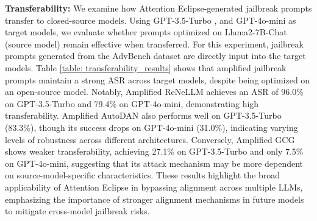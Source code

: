 \noindent \textbf{Transferability:} We examine how Attention Eclipse-generated jailbreak prompts transfer to closed-source models. Using GPT-3.5-Turbo \cite{openai2023gpt35}, and GPT-4o-mini \cite{achiam2023gpt} as target models, we evaluate whether prompts optimized on Llama2-7B-Chat (source model) remain effective when transferred. For this experiment, jailbreak prompts generated from the AdvBench dataset are directly input into the target models. Table \ref{table: transferability_results} shows that amplified jailbreak prompts maintain a strong ASR across target models, despite being optimized on an open-source model. Notably, Amplified ReNeLLM achieves an ASR of 96.0\% on GPT-3.5-Turbo and 79.4\% on GPT-4o-mini, demonstrating high transferability. Amplified AutoDAN also performs well on GPT-3.5-Turbo (83.3\%), though its success drops on GPT-4o-mini (31.0\%), indicating varying levels of robustness across different architectures. Conversely, Amplified GCG shows weaker transferability, achieving 27.1\% on GPT-3.5-Turbo and only 7.5\% on GPT-4o-mini, suggesting that its attack mechanism may be more dependent on source-model-specific characteristics. These results highlight the broad applicability of Attention Eclipse in bypassing alignment across multiple LLMs, emphasizing the importance of stronger alignment mechanisms in future models to mitigate cross-model jailbreak risks.



\begin{table}[h]
\centering
{}
\caption{Cross-model transferability of amplified prompts from Llama2-7B-Chat to closed-source LLMs.}
\label{table: transferability_results}  
\end{table}








